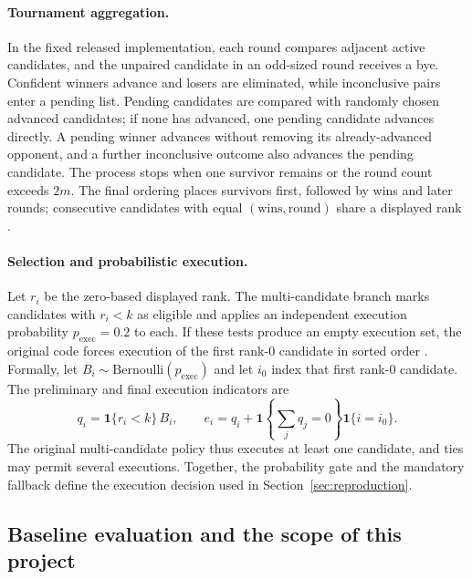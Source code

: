 \documentclass{article}
\begin{document}
\paragraph{Tournament aggregation.}
In the fixed released implementation, each round compares adjacent active candidates, and the unpaired candidate in an odd-sized round receives a bye. Confident winners advance and losers are eliminated, while inconclusive pairs enter a pending list. Pending candidates are compared with randomly chosen advanced candidates; if none has advanced, one pending candidate advances directly. A pending winner advances without removing its already-advanced opponent, and a further inconclusive outcome also advances the pending candidate. The process stops when one survivor remains or the round count exceeds $2m$. The final ordering places survivors first, followed by wins and later rounds; consecutive candidates with equal $(\text{wins},\text{round})$ share a displayed rank \citep{foreagentcode}.

\paragraph{Selection and probabilistic execution.}
Let $r_i$ be the zero-based displayed rank. The multi-candidate branch marks candidates with $r_i<k$ as eligible and applies an independent execution probability $p_{\mathrm{exec}}=0.2$ to each. If these tests produce an empty execution set, the original code forces execution of the first rank-0 candidate in sorted order \citep{foreagentcode}. Formally, let $B_i\sim\mathrm{Bernoulli}(p_{\mathrm{exec}})$ and let $i_0$ index that first rank-0 candidate. The preliminary and final execution indicators are
\begin{equation}
  q_i=\mathbf{1}\{r_i<k\}\,B_i,\qquad
  e_i=q_i+\mathbf{1}\!\left\{\sum_jq_j=0\right\}\mathbf{1}\{i=i_0\}.
  \label{eq:execute}
\end{equation}
The original multi-candidate policy thus executes at least one candidate, and ties may permit several executions. Together, the probability gate and the mandatory fallback define the execution decision used in Section~\ref{sec:reproduction}.

\subsection{Baseline evaluation and the scope of this project}
\end{document}
